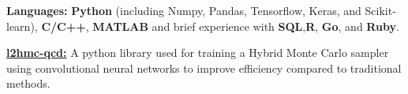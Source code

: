 \vspace{-1.75ex}


\begin{cvparagraph}

    \vspace{1.5ex}
    \begin{cvitems}
    \item {\textbf{Languages:} \textbf{Python} (including Numpy, Pandas,
            Tensorflow, Keras, and Scikit-learn), \textbf{C/C++}, \textbf{MATLAB} and
            brief experience with \textbf{SQL},\textbf{R}, \textbf{Go}, and
            \textbf{Ruby}.}
          \item {\textbf{\href{https://github.com/saforem2/l2hmc-qcd}{l2hmc-qcd:}} 
              A python library used for training a Hybrid Monte Carlo sampler using 
              convolutional neural networks to improve efficiency compared to
              traditional methods.}
   \end{cvitems}

\end{cvparagraph}


